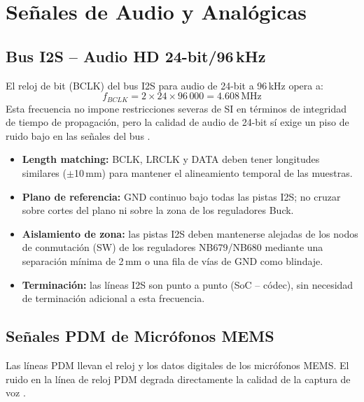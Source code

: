 \section{Señales de Audio y Analógicas}
\label{sec:si_audio}

\subsection{Bus I2S -- Audio HD 24-bit/96\,kHz}
\label{subsec:si_i2s}

El reloj de bit (BCLK) del bus I2S para audio de 24-bit a 96\,kHz opera a:
\[
  f_{BCLK} = 2 \times 24 \times 96\,000 = 4.608\,\text{MHz}
\]
Esta frecuencia no impone restricciones severas de SI en términos de integridad
de tiempo de propagación, pero la calidad de audio de 24-bit sí exige un piso de
ruido bajo en las señales del bus .

\begin{sibox}
  \begin{itemize}
    \item \textbf{Length matching:} BCLK, LRCLK y DATA deben tener longitudes
      similares ($\pm$10\,mm) para mantener el alineamiento temporal de las muestras.
    \item \textbf{Plano de referencia:} GND continuo bajo todas las pistas I2S;
      no cruzar sobre cortes del plano ni sobre la zona de los reguladores Buck.
    \item \textbf{Aislamiento de zona:} las pistas I2S deben mantenerse alejadas
      de los nodos de conmutación (SW) de los reguladores NB679/NB680 mediante
      una separación mínima de 2\,mm o una fila de vías de GND como blindaje.
    \item \textbf{Terminación:} las líneas I2S son punto a punto (SoC -- códec),
      sin necesidad de terminación adicional a esta frecuencia.
  \end{itemize}
\end{sibox}

\subsection{Señales PDM de Micrófonos MEMS}
\label{subsec:si_pdm}

Las líneas PDM llevan el reloj y los datos digitales de los micrófonos MEMS.
El ruido en la línea de reloj PDM degrada directamente la calidad de la captura
de voz .

